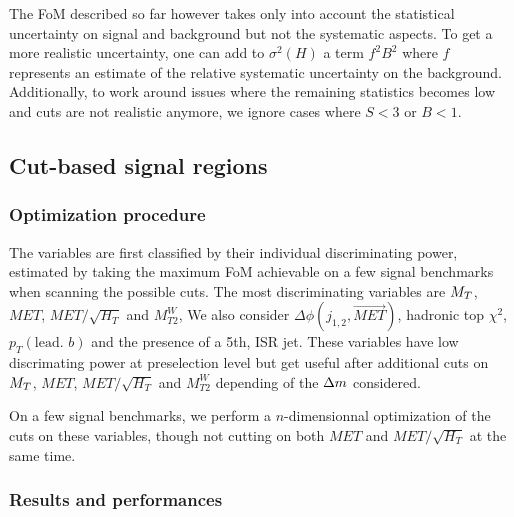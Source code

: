             The FoM described so far however takes only into account the statistical uncertainty on signal and 
            background but not the systematic aspects. To get a more realistic uncertainty, one can add to 
            $\sigma^2(H)$ a term $f^2 B^2$ where $f$ represents an estimate of the relative systematic uncertainty 
            on the background. Additionally, to work around issues where the remaining statistics becomes low and 
            cuts are not realistic anymore, we ignore cases where $S < 3$ or $B < 1$.


        \subsection{Cut-based signal regions}

            \subsubsection{Optimization procedure}

            The variables are first classified by their individual discriminating power, estimated by taking the 
            maximum FoM achievable on a few signal benchmarks when scanning the possible cuts. The most 
            discriminating variables are $M_T$, $MET$, $MET/\sqrt{H_T}$ and $M_{T2}^{W}$, We also consider 
            $\Delta \phi(j_{1,2},\vec{MET})$, hadronic top $\chi^2$, $p_T(\text{lead. } b)$ and the presence of a
            5th, ISR jet. These variables have low discrimating power at preselection level but get useful after
            additional cuts on $M_T$, $MET$, $MET/\sqrt{H_T}$ and $M_{T2}^W$ depending of the $\Delta m$ considered.

            On a few signal benchmarks, we perform a $n$-dimensionnal optimization of the cuts on these variables,
            though not cutting on both $MET$ and $MET/\sqrt{H_T}$ at the same time. 



            \subsubsection{Results and performances}

            

            \loremipsum

